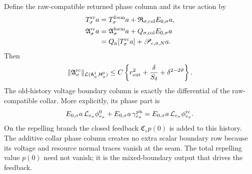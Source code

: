 \begin{lemma}
Define the raw-compatible returned phase column and its true action by
\begin{align}
 T_\sigma^{\rm rc}a
 &=T_\sigma^{\rm form}a
       +\mathfrak R_{\sigma,\rm col}E_{0,\sigma}a,\notag\\
 \mathfrak A_\sigma^{\rm rc}a
 &=\mathfrak A_\sigma^{\rm form}a
       +Q_{\sigma,\rm col}E_{0,\sigma}a\notag\\
 &=Q_{\rm n}[T_\sigma^{\rm rc}a]
       +\mathscr P_{c,\sigma,N}a.                \label{eq:raw-compatible-true-action}
\end{align}
Then
\begin{equation}
 \|\mathfrak A_\sigma^{\rm rc}\|_{
   \mathcal L(\mathsf A_\phi^1,\mathsf H_\phi^0)}
 \le C\left\{r_{\rm out}^2+\frac{\delta}{S_\delta}
                     +\delta^{2-2\vartheta}\right\}.
                                                        \label{eq:raw-compatible-action-smallness}
\end{equation}
The old-history voltage boundary column is exactly the differential of the
raw-compatible collar.  More explicitly, its phase part is
\begin{equation}
 E_{0,\sigma}a\,\mathcal L_{e_\sigma}\phi_{e_\sigma}^0
 +E_{0,\sigma}a\,\gamma_{e_\sigma}^{\rm ph}
 =E_{0,\sigma}a\,\mathcal L_{e_\sigma}
                         \phi_{e_\sigma}^{\rm rc}.           \label{eq:raw-phase-collar-exact-assembly}
\end{equation}
On the repelling branch the closed feedback
\(\mathfrak C_ep(0)\) is added to this history.  The additive collar phase
column creates no extra scalar boundary row because its voltage and resource
normal traces vanish at the seam.  The total repelling value \(p(0)\) need
not vanish; it is the mixed-boundary output that drives the feedback.
\end{lemma}

